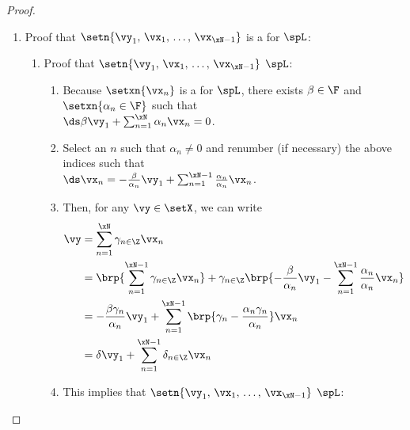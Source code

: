 \begin{proof}
\begin{enumerate}
  \item Proof that $\setn{\vy_1,\,\vx_1,\,\ldots,\,\vx_{\xN-1}}$ is a  for $\spL$: \label{item:x1phiN1}
    \begin{enumerate}
      \item Proof that $\setn{\vy_1,\,\vx_1,\,\ldots,\,\vx_{\xN-1}}$  $\spL$:
        \begin{enumerate}
          \item Because $\setxn{\vx_n}$ is a  for $\spL$, there exists $\beta\in\F$ and $\setxn{\alpha_n\in\F}$ such that
            \\$\ds \beta\vy_1 + \sum_{n=1}^\xN \alpha_n\vx_{n} = 0$.\label{item:frm_MN_beta}
          \item Select an $n$ such that $\alpha_n\neq0$ and renumber (if necessary) the above indices such that
            \\$\ds\vx_{n} = -\frac{\beta}{\alpha_n}\vy_1 +  \sum_{n=1}^{\xN-1} \frac{\alpha_n}{\alpha_n}\vx_n$.
          \item Then, for any $\vy\in\setX$, we can write
            \begin{align*}
              \vy
                &= \sum_{n=1}^\xN \gamma_{n\in\Z} \vx_n
              \\&= \brp{\sum_{n=1}^{\xN-1} \gamma_{n\in\Z} \vx_n} + \gamma_{n\in\Z} \brp{-\frac{\beta}{\alpha_n}\vy_1- \sum_{n=1}^{\xN-1} \frac{\alpha_n}{\alpha_n}\vx_n}
              \\&= -\frac{\beta\gamma_n}{\alpha_n}\vy_1 + {\sum_{n=1}^{\xN-1} \brp{\gamma_n-\frac{\alpha_n\gamma_n}{\alpha_n}} \vx_n}
              \\&= \delta\vy_1 + \sum_{n=1}^{\xN-1}\delta_{n\in\Z} \vx_n
            \end{align*}
          \item This implies that $\setn{\vy_1,\,\vx_1,\,\ldots,\,\vx_{\xN-1}}$  $\spL$:
        \end{enumerate}


\end{enumerate}
\end{enumerate}
\end{proof}
